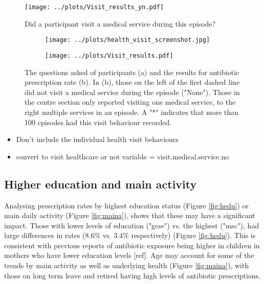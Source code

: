 \documentclass{article}
\begin{document}
	\begin{figure}[htbp]
		\centering
		\texttt{[image: ../plots/Visit\_results\_yn.pdf]}
		\caption{Did a participant visit a medical service during this episode?}
		\label{fig:visityn}
	\end{figure} 

\begin{figure}[htbp]
    \centering
    \begin{subfigure}[b]{0.35\textwidth}
   		\texttt{[image: ../plots/health\_visit\_screenshot.jpg]}
   		\caption{}
   		\label{fig:healthss}
    \end{subfigure}
    \begin{subfigure}[b]{0.55\textwidth}
        \texttt{[image: ../plots/Visit\_results.pdf]}
		\caption{}
		\label{fig:visit}
    \end{subfigure}
    \caption{The questions asked of participants (a) and the results for antibiotic prescription rate (b). In (b), those on the left of the first dashed line did not visit a medical service during the episode ("None"). Those in the centre section only reported visiting one medical service, to the right multiple services in an episode. A "*" indicates that more than 100 episodes had this visit behaviour recorded.}
    \label{fig:visitf}
\end{figure}


\begin{itemize}
	\item Don't include the individual health visit behaviours
	\item convert to visit healthcare or not variable = visit.medical.service.no
\end{itemize}

\subsection{Higher education and main activity}

Analysing prescription rates by highest education status (Figure \ref{fig:hedu}) or main daily activity (Figure \ref{fig:maina}), shows that these may have a significant impact. Those with lower levels of education ("gcse") vs. the highest ("msc"), had large differences in rates (8.6\% vs. 3.4\% respectively) (Figure \ref{fig:hedu}). This is consistent with previous reports of antibiotic exposure being higher in children in mothers who have lower education levels [ref]. Age may account for some of the trends by main activity as well as underlying health (Figure \ref{fig:maina}), with those on long term leave and retired having high levels of antibiotic prescriptions. 
\end{document}
